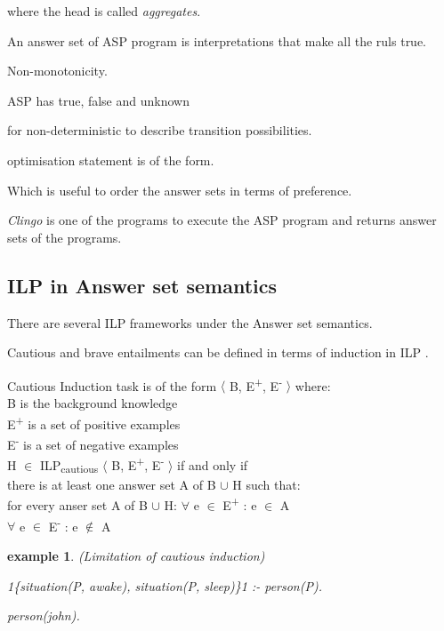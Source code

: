 \documentclass[12pt,twoside]{report}
\newtheorem{examp}{example}[section]
\begin{document}
where the head is called \textit{aggregates}.

An answer set of ASP program is interpretations that make all the ruls true.

Non-monotonicity.

ASP has true, false and unknown

for non-deterministic to describe transition possibilities.

optimisation statement is of the form.

Which is useful to order the answer sets in terms of preference.

\textit{Clingo} is one of the programs to execute the ASP program and returns answer sets of the programs.


\subsection{ILP in Answer set semantics}

There are several ILP frameworks under the Answer set semantics.

Cautious and brave entailments can be defined in terms of induction in ILP \cite{Sakama2009}.


Cautious Induction task is of the form $\langle$ B, E\textsuperscript{+}, E\textsuperscript{-} $\rangle$ where: \\
B is the background knowledge \\
E\textsuperscript{+} is a set of positive examples \\
E\textsuperscript{-} is a set of negative examples \\

 H $\in$ ILP\textsubscript{cautious} $\langle$ B, E\textsuperscript{+}, E\textsuperscript{-} $\rangle$ if and only if  \\

 there is at least one answer set A of B $\cup$ H such that: \\
 for every anser set A of B $\cup$ H:
$\forall$ e $\in$ E\textsuperscript{+} : e $\in$ A \\
$\forall$ e $\in$ E\textsuperscript{-} : e $\notin$ A \\

\begin{examp} (Limitation of cautious induction)

1\{situation(P, awake), situation(P, sleep)\}1 :- person(P).

person(john).
\end{examp}
\label{limitation_cautious}
\end{document}

